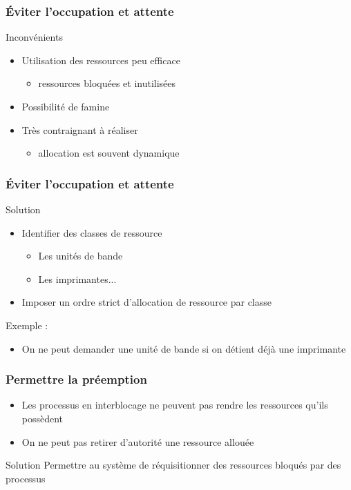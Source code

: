 \begin{frame}
\frametitle{Éviter l’occupation et attente}
\begin{block}{Inconvénients}
\begin{itemize}
\item Utilisation des ressources peu efficace
\begin{itemize}
\item ressources bloquées et inutilisées
\end{itemize}
\item Possibilité de famine
\item Très contraignant à réaliser
\begin{itemize}
\item allocation est souvent dynamique
\end{itemize}
\end{itemize}
\end{block}
\end{frame}

\begin{frame}
\frametitle{Éviter l’occupation et attente}
\begin{block}{Solution}
\begin{itemize}
\item Identifier des classes de ressource
\begin{itemize}
\item Les unités de bande
\item Les imprimantes...
\end{itemize}
\item Imposer un ordre strict d’allocation de ressource par classe
\end{itemize}
\end{block}

Exemple :
\begin{itemize}
\item On ne peut demander une unité de bande si on détient déjà une imprimante
\end{itemize}
\end{frame}

\begin{frame}
\frametitle{Permettre la préemption}
\begin{itemize}
\item Les processus en interblocage ne peuvent pas rendre les ressources qu’ils possèdent
\item On ne peut pas retirer d'autorité une ressource allouée
\end{itemize}
\begin{block}{Solution}
Permettre au système de réquisitionner des ressources bloqués par des processus
\end{block}
\end{frame}

